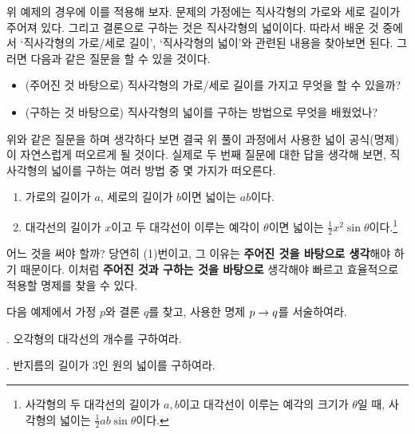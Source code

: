 위 예제의 경우에 이를 적용해 보자. 문제의 가정에는 직사각형의 가로와 세로 길이가 주어져 있다. 그리고 결론으로 구하는 것은 직사각형의 넓이이다. 따라서 배운 것 중에서 `직사각형의 가로/세로 길이', `직사각형의 넓이'와 관련된 내용을 찾아보면 된다. 그러면 다음과 같은 질문을 할 수 있을 것이다.
\begin{itemize}
    \item (주어진 것 바탕으로) 직사각형의 가로/세로 길이를 가지고 무엇을 할 수 있을까?
    \item (구하는 것 바탕으로) 직사각형의 넓이를 구하는 방법으로 무엇을 배웠었나?
\end{itemize}
위와 같은 질문을 하며 생각하다 보면 결국 위 풀이 과정에서 사용한 넓이 공식(명제)이 자연스럽게 떠오르게 될 것이다. 실제로 두 번째 질문에 대한 답을 생각해 보면, 직사각형의 넓이를 구하는 여러 방법 중 몇 가지가 떠오른다.
\begin{enumerate}
    \item 가로의 길이가 \(a\), 세로의 길이가 \(b\)이면 넓이는 \(ab\)이다.
    \item 대각선의 길이가 \(x\)이고 두 대각선이 이루는 예각이 \(\theta\)이면 넓이는 \(\frac{1}{2}x^2 \sin \theta\)이다.\footnote{사각형의 두 대각선의 길이가 \(a, b\)이고 대각선이 이루는 예각의 크기가 \(\theta\)일 때, 사각형의 넓이는 \(\frac{1}{2}ab\sin\theta\)이다.}
\end{enumerate}
어느 것을 써야 할까? 당연히 (1)번이고, 그 이유는 \textbf{주어진 것을 바탕으로 생각}해야 하기 때문이다.  이처럼 \textbf{주어진 것과 구하는 것을 바탕으로} 생각해야 빠르고 효율적으로 적용할 명제를 찾을 수 있다.


\medskip

다음 예제에서 가정 \(p\)와 결론 \(q\)를 찾고, 사용한 명제 \(p \rightarrow q\)를 서술하여라.

\ex. 오각형의 대각선의 개수를 구하여라.

\vspace*{80px}

\ex. 반지름의 길이가 \(3\)인 원의 넓이를 구하여라.

\vspace*{80px}

\pagebreak

